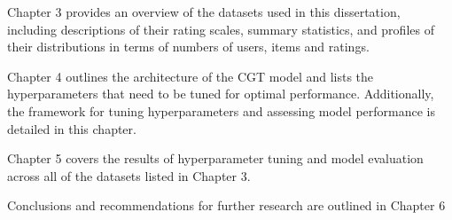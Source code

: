Chapter 3 provides an overview of the datasets used in this dissertation, including descriptions of their rating scales, summary statistics, and profiles of their distributions in terms of numbers of users, items and ratings.

Chapter 4 outlines the architecture of the CGT model and lists the hyperparameters that need to be tuned for optimal performance. Additionally, the framework for tuning hyperparameters and assessing model performance is detailed in this chapter.

Chapter 5 covers the results of hyperparameter tuning and model evaluation across all of the datasets listed in Chapter 3.

Conclusions and recommendations for further research are outlined in Chapter 6


 